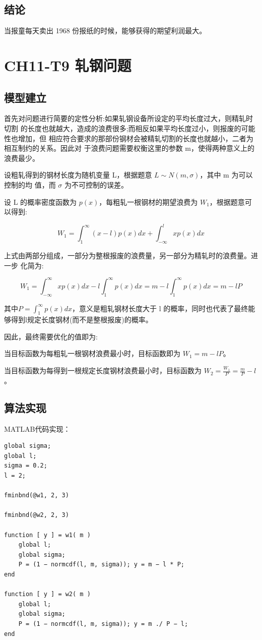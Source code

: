 \documentclass{article}
\begin{document}
\subsection{结论}

当报童每天卖出 1968 份报纸的时候，能够获得的期望利润最大。


\section{CH11-T9 轧钢问题}
\subsection{模型建立}

首先对问题进行简要的定性分析:如果轧钢设备所设定的平均长度过大，则精轧时切割 的长度也就越大，造成的浪费很多;而相反如果平均长度过小，则报废的可能性也增加，但 相应符合要求的那部份钢材会被精轧切割的长度也就越小，二者为相互制约的关系。因此对 于浪费问题需要权衡这里的参数 m，使得两种意义上的浪费最少。

设粗轧得到的钢材长度为随机变量 L，根据题意 $L\sim N (m, \sigma)$，其中 m 为可以控制的均 值，而 $\sigma$ 为不可控制的误差。

设 L 的概率密度函数为 $p(x)$，每粗轧一根钢材的期望浪费为 $W_1$，根据题意可以得到:

$$W_1=\int^\infty_1(x-l)p(x)dx+\int^l_{-\infty}xp(x)dx$$

上式由两部分组成，一部分为整根报废的浪费量，另一部分为精轧时的浪费量。进一步 化简为:

$$W_1=\int^{\infty}_{-\infty}xp(x)dx-l\int^{\infty}_1p(x)dx=m-l\int^\infty_1p(x)dx=m-lP$$

其中$P=\int^\infty_1p(x)dx$，意义是粗轧钢材长度大于 l 的概率，同时也代表了最终能够得到l规定长度钢材(而不是整根报废)的概率。

因此，最终需要优化的值即为:

当目标函数为每粗轧一根钢材浪费最小时，目标函数即为 $W_1 = m − lP$。

当目标函数为每得到一根规定长度钢材浪费最小时，目标函数为 $W_2 = \frac{W_1}{P} = \frac mP − l$。


\subsection{算法实现}

MATLAB代码实现：

\begin{lstlisting}
global sigma;
global l;
sigma = 0.2;
l = 2;

fminbnd(@w1, 2, 3)

fminbnd(@w2, 2, 3)

function [ y ] = w1( m )
    global l;
	global sigma;
	P = (1 − normcdf(l, m, sigma)); y = m − l * P;
end

function [ y ] = w2( m )
    global l;
	global sigma;
	P = (1 − normcdf(l, m, sigma)); y = m ./ P − l;
end

\end{lstlisting}
\end{document}

